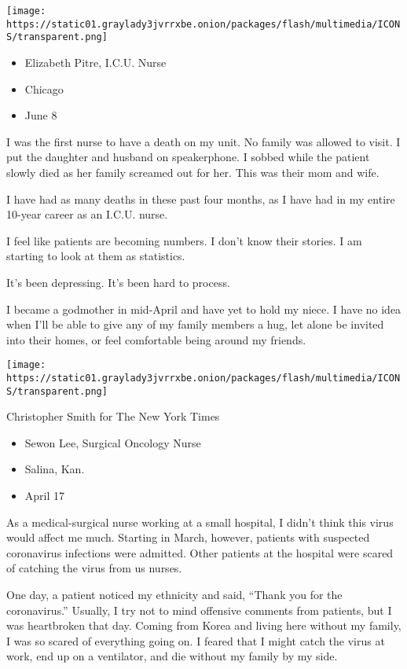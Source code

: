 \texttt{[image: https://static01.graylady3jvrrxbe.onion/packages/flash/multimedia/ICONS/transparent.png]}

\begin{itemize}
\tightlist
\item
  Elizabeth Pitre, I.C.U. Nurse
\item
  Chicago
\item
  June 8
\end{itemize}

I was the first nurse to have a death on my unit. No family was allowed
to visit. I put the daughter and husband on speakerphone. I sobbed while
the patient slowly died as her family screamed out for her. This was
their mom and wife.

I have had as many deaths in these past four months, as I have had in my
entire 10-year career as an I.C.U. nurse.

I feel like patients are becoming numbers. I don't know their stories. I
am starting to look at them as statistics.

It's been depressing. It's been hard to process.

I became a godmother in mid-April and have yet to hold my niece. I have
no idea when I'll be able to give any of my family members a hug, let
alone be invited into their homes, or feel comfortable being around my
friends.

\texttt{[image: https://static01.graylady3jvrrxbe.onion/packages/flash/multimedia/ICONS/transparent.png]}

Christopher Smith for The New York Times

\begin{itemize}
\tightlist
\item
  Sewon Lee, Surgical Oncology Nurse
\item
  Salina, Kan.
\item
  April 17
\end{itemize}

As a medical-surgical nurse working at a small hospital, I didn't think
this virus would affect me much. Starting in March, however, patients
with suspected coronavirus infections were admitted. Other patients at
the hospital were scared of catching the virus from us nurses.

One day, a patient noticed my ethnicity and said, ``Thank you for the
coronavirus.'' Usually, I try not to mind offensive comments from
patients, but I was heartbroken that day. Coming from Korea and living
here without my family, I was so scared of everything going on. I feared
that I might catch the virus at work, end up on a ventilator, and die
without my family by my side.

